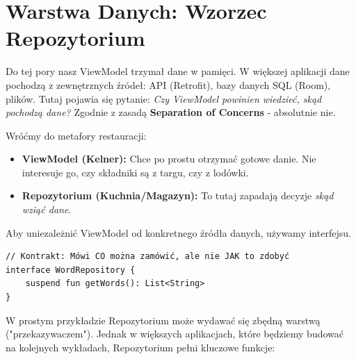 \section{Warstwa Danych: Wzorzec Repozytorium}

Do tej pory nasz ViewModel trzymał dane w pamięci. W większej aplikacji dane pochodzą z zewnętrznych źródeł: API (Retrofit), bazy danych SQL (Room), plików. Tutaj pojawia się pytanie: \textit{Czy ViewModel powinien wiedzieć, skąd pochodzą dane?}
Zgodnie z zasadą \textbf{Separation of Concerns} - absolutnie nie.

Wróćmy do metafory restauracji:
\begin{itemize}
    \item \textbf{ViewModel (Kelner):} Chce po prostu otrzymać gotowe danie. Nie interesuje go, czy składniki są z targu, czy z lodówki.
    \item \textbf{Repozytorium (Kuchnia/Magazyn):} To tutaj zapadają decyzje \textit{skąd wziąć dane}.
\end{itemize}

Aby uniezależnić ViewModel od konkretnego źródła danych, używamy interfejsu.

\begin{verbatim}
// Kontrakt: Mówi CO można zamówić, ale nie JAK to zdobyć
interface WordRepository {
    suspend fun getWords(): List<String>
}
\end{verbatim}

W prostym przykładzie Repozytorium może wydawać się zbędną warstwą ("przekazywaczem"). Jednak w większych aplikacjach, które będziemy budować na kolejnych wykładach, Repozytorium pełni kluczowe funkcje:

